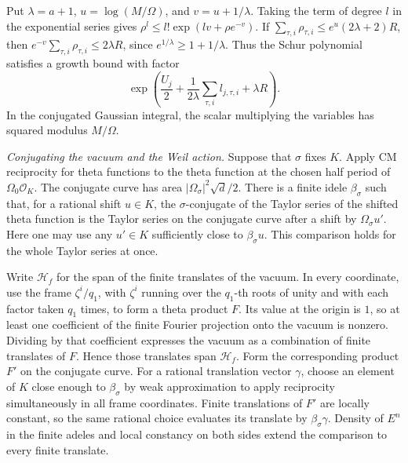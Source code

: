 Put \(\lambda=a+1\), \(u=\log(M/\Omega)\), and \(v=u+1/\lambda\).
Taking the term of degree \(l\) in the exponential series gives
\(\rho^l\le l!\exp(lv+\rho e^{-v})\).
If \(\sum_{\tau,i}\rho_{\tau,i}\le e^u(2\lambda+2)R\), then
\(e^{-v}\sum_{\tau,i}\rho_{\tau,i}\le2\lambda R\), since
\(e^{1/\lambda}\ge1+1/\lambda\).
Thus the Schur polynomial satisfies a growth bound with factor
\[
 \exp\!\left(\frac{U_j}{2}
       +\frac1{2\lambda}\sum_{\tau,i}l_{j,\tau,i}+\lambda R\right).
\]
In the conjugated Gaussian integral, the scalar multiplying the
variables has squared modulus \(M/\Omega\).

\emph{Conjugating the vacuum and the Weil action.}
Suppose that \(\sigma\) fixes \(K\). Apply CM reciprocity for theta
functions to the theta function at the chosen half period of
\(\Omega_0\mathcal O_K\). The conjugate curve has area
\(|\Omega_\sigma|^2\sqrt d/2\). There is a finite idele \(\beta_\sigma\)
such that, for a rational shift \(u\in K\), the \(\sigma\)-conjugate
of the Taylor series of the shifted theta function is the Taylor
series on the conjugate curve after a shift by \(\Omega_\sigma u'\).
Here one may use any \(u'\in K\) sufficiently close to \(\beta_\sigma u\).
This comparison holds for the whole Taylor series at once.

Write \(\mathscr H_f\) for the span of the finite translates of the
vacuum. In every coordinate, use the frame \(\zeta^i/q_1\), with
\(\zeta^i\) running over the \(q_1\)-th roots of unity and with each
factor taken \(q_1\) times, to form a theta product \(F\).
Its value at the origin is \(1\), so at least one coefficient of
the finite Fourier projection onto the vacuum is nonzero.
Dividing by that coefficient expresses the vacuum as a combination
of finite translates of \(F\). Hence those translates span
\(\mathscr H_f\). Form the corresponding product \(F'\) on the conjugate
curve. For a rational translation vector \(\gamma\), choose an element
of \(K\) close enough to \(\beta_\sigma\) by weak approximation to
apply reciprocity simultaneously in all frame coordinates.
Finite translations of \(F'\) are locally constant, so the same rational
choice evaluates its translate by \(\beta_\sigma\gamma\).
Density of \(E^n\) in the finite adeles and local constancy on both
sides extend the comparison to every finite translate.

